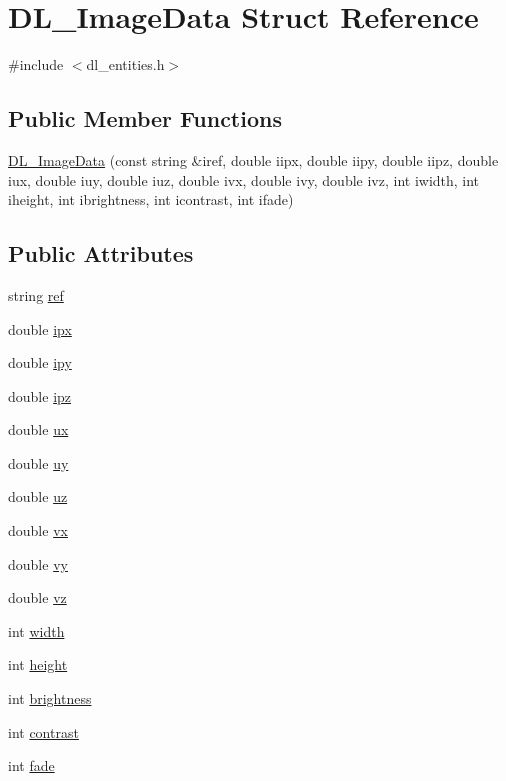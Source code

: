 \hypertarget{structDL__ImageData}{\section{D\-L\-\_\-\-Image\-Data Struct Reference}
\label{structDL__ImageData}
}


{\ttfamily \#include $<$dl\-\_\-entities.\-h$>$}

\subsection*{Public Member Functions}
\begin{DoxyCompactItemize}
\item 
\hyperlink{structDL__ImageData_aebdef46a2d80c355e228b176261f3e3e}{D\-L\-\_\-\-Image\-Data} (const string \&iref, double iipx, double iipy, double iipz, double iux, double iuy, double iuz, double ivx, double ivy, double ivz, int iwidth, int iheight, int ibrightness, int icontrast, int ifade)
\end{DoxyCompactItemize}
\subsection*{Public Attributes}
\begin{DoxyCompactItemize}
\item 
string \hyperlink{structDL__ImageData_ae3a5ca8dacf800eb6d957e8526802b4a}{ref}
\item 
double \hyperlink{structDL__ImageData_a84d5e166e086f6f7f99aa912f64ef902}{ipx}
\item 
double \hyperlink{structDL__ImageData_aacb562ea979a2031519f26de48de32e6}{ipy}
\item 
double \hyperlink{structDL__ImageData_a0b35d716d697629558b5af6e9cbb00f5}{ipz}
\item 
double \hyperlink{structDL__ImageData_acad3e28ee5c9654d851120928a4aeb88}{ux}
\item 
double \hyperlink{structDL__ImageData_a51bf669167d8017f8a3272628a8b3c57}{uy}
\item 
double \hyperlink{structDL__ImageData_a5f83122bf953cae7d96871847b59268d}{uz}
\item 
double \hyperlink{structDL__ImageData_afa9d87c2584ab8f8e7010579d302a7aa}{vx}
\item 
double \hyperlink{structDL__ImageData_acdc17067ae709f2c21ca772e592acc14}{vy}
\item 
double \hyperlink{structDL__ImageData_aa2f02fb820c34ab50f33913770bb1697}{vz}
\item 
int \hyperlink{structDL__ImageData_af9c24b61881540aeb90e01104cb019f8}{width}
\item 
int \hyperlink{structDL__ImageData_a43db5e2bdc1c7dca3ee32fdc8400613d}{height}
\item 
int \hyperlink{structDL__ImageData_a431b0e517350cc8bfbc5a293f1b61481}{brightness}
\item 
int \hyperlink{structDL__ImageData_aaa222cf2a68d3d52c424fe02a8c93475}{contrast}
\item 
int \hyperlink{structDL__ImageData_a1126098cf0a76bbc4a65b7bfa312356b}{fade}
\end{DoxyCompactItemize}


